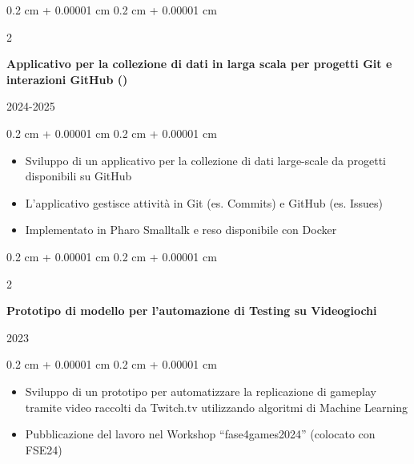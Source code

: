 \documentclass[10pt, letterpaper]{article}
\newenvironment{highlights}{
    \begin{itemize}[
        topsep=0.10 cm,
        parsep=0.10 cm,
        partopsep=0pt,
        itemsep=0pt,
        leftmargin=0.4 cm + 10pt
    ]
}{
    \end{itemize}
} %
\newenvironment{onecolentry}{
    \begin{adjustwidth}{
        0.2 cm + 0.00001 cm
    }{
        0.2 cm + 0.00001 cm
    }
}{
    \end{adjustwidth}
} %
\newenvironment{twocolentry}[2][]{
    \onecolentry
    \def\secondColumn{#2}
    \setcolumnwidth{\fill, 4.5 cm}
    \begin{paracol}{2}
}{
    \switchcolumn \raggedleft \secondColumn
    \end{paracol}
    \endonecolentry
} %
\let\hrefWithoutArrow\href
\renewcommand{\href}[2]{\hrefWithoutArrow{#1}{\ifthenelse{\equal{#2}{}}{ }{#2 }\raisebox{.15ex}{\footnotesize \faExternalLink*}}}
\begin{document}
        \vspace{0.2 cm}

        \begin{twocolentry}{
            
            
        2024-2025}
            \textbf{Applicativo per la collezione di dati in larga scala per progetti Git e interazioni GitHub (\href{https://github.com/USIREVEAL/gitminer}{gitminer})}
        \end{twocolentry}

        \vspace{0.10 cm}
        \begin{onecolentry}
            \begin{highlights}

                \item Sviluppo di un applicativo per la collezione di dati large-scale da progetti disponibili su GitHub
                \item L'applicativo gestisce attività in Git (es. Commits) e GitHub (es. Issues)
                \item Implementato in Pharo Smalltalk e reso disponibile con Docker
            \end{highlights}
        \end{onecolentry}


        \vspace{0.2 cm}
        
        
        \begin{twocolentry}{
            
            
        2023}
            \textbf{Prototipo di modello per l'automazione di Testing su Videogiochi}
        \end{twocolentry}

        \vspace{0.10 cm}
        \begin{onecolentry}
            \begin{highlights}
                \item Sviluppo di un prototipo per automatizzare la replicazione di gameplay tramite video raccolti da Twitch.tv utilizzando algoritmi di Machine Learning
                \item Pubblicazione del lavoro nel Workshop ``fase4games2024'' (colocato con FSE24)
            \end{highlights}
        \end{onecolentry}


        \vspace{0.2 cm}
\end{document}
